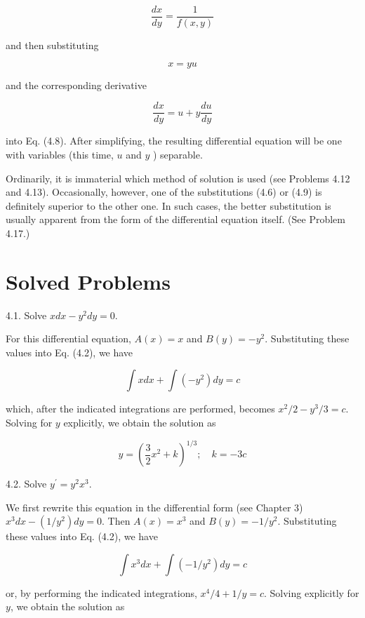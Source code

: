 \documentclass[10pt]{article}
\begin{document}
\begin{equation*}
\frac{d x}{d y}=\frac{1}{f(x, y)} \tag{4.8}
\end{equation*}


and then substituting


\begin{equation*}
x=y u \tag{4.9}
\end{equation*}


and the corresponding derivative


\begin{equation*}
\frac{d x}{d y}=u+y \frac{d u}{d y} \tag{4.10}
\end{equation*}


into Eq. (4.8). After simplifying, the resulting differential equation will be one with variables (this time, $u$ and $y$ ) separable.

Ordinarily, it is immaterial which method of solution is used (see Problems 4.12 and 4.13). Occasionally, however, one of the substitutions (4.6) or (4.9) is definitely superior to the other one. In such cases, the better substitution is usually apparent from the form of the differential equation itself. (See Problem 4.17.)

\section*{Solved Problems}
4.1. Solve $x d x-y^{2} d y=0$.

For this differential equation, $A(x)=x$ and $B(y)=-y^{2}$. Substituting these values into Eq. (4.2), we have

$$
\int x d x+\int\left(-y^{2}\right) d y=c
$$

which, after the indicated integrations are performed, becomes $x^{2} / 2-y^{3} / 3=c$. Solving for $y$ explicitly, we obtain the solution as

$$
y=\left(\frac{3}{2} x^{2}+k\right)^{1 / 3} ; \quad k=-3 c
$$

4.2. Solve $y^{\prime}=y^{2} x^{3}$.

We first rewrite this equation in the differential form (see Chapter 3) $x^{3} d x-\left(1 / y^{2}\right) d y=0$. Then $A(x)=x^{3}$ and $B(y)=-1 / y^{2}$. Substituting these values into Eq. (4.2), we have

$$
\int x^{3} d x+\int\left(-1 / y^{2}\right) d y=c
$$

or, by performing the indicated integrations, $x^{4} / 4+1 / y=c$. Solving explicitly for $y$, we obtain the solution as
\end{document}
